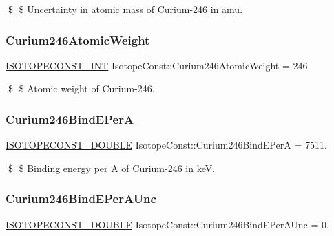 \$ \$ Uncertainty in atomic mass of Curium-\/246 in amu. \mbox{\label{group___isotope_const-_curium-_cm246_ga6d64c7ba3e72d944f36c6be541709576}} 
\subsubsection{\texorpdfstring{Curium246\+Atomic\+Weight}{Curium246AtomicWeight}}
{\footnotesize\ttfamily \mbox{\hyperlink{group___isotope_const-_macros_ga5f18360b3e99483a35c32d789e62621c}{I\+S\+O\+T\+O\+P\+E\+C\+O\+N\+S\+T\+\_\+\+I\+NT}} Isotope\+Const\+::\+Curium246\+Atomic\+Weight = 246}

\$ \$ Atomic weight of Curium-\/246. \mbox{\label{group___isotope_const-_curium-_cm246_gae6b26a005fb1229a1c89b0d70175ae7b}} 
\subsubsection{\texorpdfstring{Curium246\+Bind\+E\+PerA}{Curium246BindEPerA}}
{\footnotesize\ttfamily \mbox{\hyperlink{group___isotope_const-_macros_ga8f45a7272ce02c0b4c65c44636ed719a}{I\+S\+O\+T\+O\+P\+E\+C\+O\+N\+S\+T\+\_\+\+D\+O\+U\+B\+LE}} Isotope\+Const\+::\+Curium246\+Bind\+E\+PerA = 7511.}

\$ \$ Binding energy per A of Curium-\/246 in keV. \mbox{\label{group___isotope_const-_curium-_cm246_gac0d579135deacabedfae27377b32318e}} 
\subsubsection{\texorpdfstring{Curium246\+Bind\+E\+Per\+A\+Unc}{Curium246BindEPerAUnc}}
{\footnotesize\ttfamily \mbox{\hyperlink{group___isotope_const-_macros_ga8f45a7272ce02c0b4c65c44636ed719a}{I\+S\+O\+T\+O\+P\+E\+C\+O\+N\+S\+T\+\_\+\+D\+O\+U\+B\+LE}} Isotope\+Const\+::\+Curium246\+Bind\+E\+Per\+A\+Unc = 0.}


